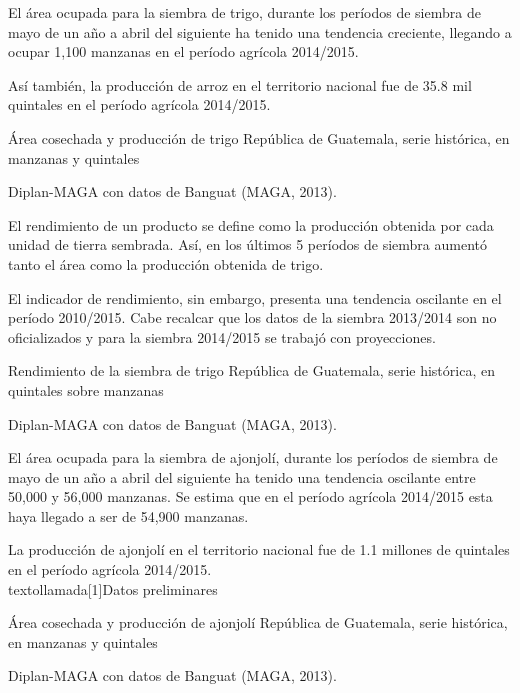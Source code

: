 
%
{%
El área ocupada para la siembra de trigo, durante los períodos de siembra de mayo de un año a abril del siguiente ha tenido una tendencia creciente, llegando a ocupar 1,100  manzanas en el período agrícola 2014/2015.

Así también, la producción de arroz en el territorio nacional fue de 35.8 mil quintales en el período agrícola 2014/2015.
}%
{%
	Área cosechada y producción de trigo} %
{%
	República de Guatemala, serie histórica, en manzanas y  quintales } %
{%
	\begin{tikzpicture}[x=1pt,y=1pt]    \end{tikzpicture}}%
{%
Diplan-MAGA con datos de Banguat (MAGA, 2013).} %



%
{%
El rendimiento de un producto se define como la producción obtenida por cada unidad de tierra sembrada. Así, en los últimos 5 períodos de siembra aumentó tanto el área como la producción obtenida de trigo.

El indicador de rendimiento, sin embargo, presenta una tendencia oscilante en el período 2010/2015. Cabe recalcar que los datos de la siembra 2013/2014 son no oficializados y para la siembra 2014/2015 se trabajó con proyecciones. 
}%
{%
	Rendimiento de la siembra de trigo} %
{%
	República de Guatemala, serie histórica, en quintales sobre manzanas } %
{%
	\begin{tikzpicture}[x=1pt,y=1pt]    \end{tikzpicture}}%
{%
Diplan-MAGA con datos de Banguat (MAGA, 2013). } %


%
{%
El área ocupada para la siembra de ajonjolí, durante los períodos de siembra de mayo de un año a abril del siguiente ha tenido una tendencia oscilante entre 50,000 y 56,000 manzanas.  Se estima que en el período agrícola 2014/2015 esta haya llegado a ser de 54,900 manzanas.

La producción de ajonjolí en el territorio nacional fue de 1.1 millones de quintales en el período agrícola 2014/2015.\\textollamada[1]{Datos preliminares}
}%
{%
	Área cosechada y producción de ajonjolí} %
{%
	República de Guatemala, serie histórica, en manzanas y  quintales } %
{%
	\begin{tikzpicture}[x=1pt,y=1pt]    \end{tikzpicture}}%
{%
	Diplan-MAGA con datos de Banguat (MAGA, 2013).} %


